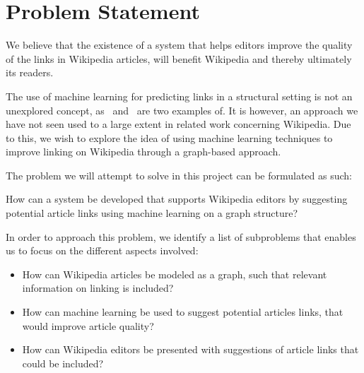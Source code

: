 \section{Problem Statement}\label{sec:problem_statement}
We believe that the existence of a system that helps editors improve the quality of the links in Wikipedia articles, will benefit Wikipedia and thereby ultimately its readers.

The use of machine learning for predicting links in a structural setting is not an unexplored concept, as~\cite{tang2015line} and~\cite{al2006link} are two examples of. It is however, an approach we have not seen used to a large extent in related work concerning Wikipedia. Due to this, we wish to explore the idea of using machine learning techniques to improve linking on Wikipedia through a graph-based approach.

The problem we will attempt to solve in this project can be formulated as such:
~\\ %
\begin{formal}
How can a system be developed that supports Wikipedia editors by suggesting potential article links using machine learning on a graph structure?
\end{formal}

In order to approach this problem, we identify a list of subproblems that enables us to focus on the different aspects involved:

\begin{itemize}
  \item How can Wikipedia articles be modeled as a graph, such that relevant information on linking is included?
  \item How can machine learning be used to suggest potential articles links, that would improve article quality?
  \item How can Wikipedia editors be presented with suggestions of article links that could be included?
\end{itemize}


